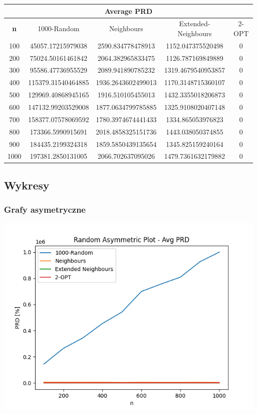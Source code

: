 \documentclass{article}
\begin{document}
\begin{center}
\begin{tabular}{|c|c|c|c|c|}
\hline
\multicolumn{5}{|c|}{\textbf{Average PRD}}\\
\hline
\textbf{n} & 1000-Random & Neighbours & Extended-Neighbours & 2-OPT\\
\hline
100 & 45057.17215979038 & 2590.834778478913 & 1152.047375520498 & 0\\
\hline
200 & 75024.50161461842 & 2064.382965833475 & 1126.787169849889 & 0\\
\hline
300 & 95586.47736955529 & 2089.941890785232 & 1319.4679540953857 & 0\\
\hline
400 & 115379.31540464885 & 1936.2643602499013 & 1170.3148715360107 & 0\\
\hline
500 & 129969.40868945165 & 1916.510105455013 & 1432.3355018206873 & 0\\
\hline
600 & 147132.99203529008 & 1877.0634799785885 & 1325.9108020407148 & 0\\
\hline
700 & 158377.07578069592 & 1780.3974674441433 & 1334.865053976823 & 0\\
\hline
800 & 173366.5990915691 & 2018.4858325151736 & 1443.038050374855 & 0\\
\hline
900 & 184435.2199324318 & 1859.5850439135654 & 1345.825159240164 & 0\\
\hline
1000 & 197381.2850131005 & 2066.702637095026 & 1479.7361632179882 & 0\\
\hline
\end{tabular}
\end{center}


\subsection{Wykresy}

\subsubsection{Grafy asymetryczne}

\begin{center}
\includegraphics[width=\textwidth, 
                   height = 0.4\textheight, 
                   keepaspectratio]
                  {generated_asym_avg_prd} 
\end{center}
\end{document}
